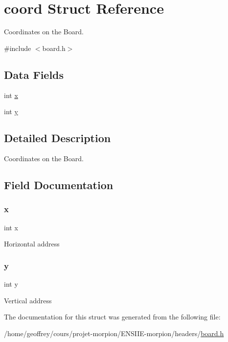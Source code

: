 \hypertarget{structcoord}{}\section{coord Struct Reference}
\label{structcoord}


Coordinates on the Board.  




{\ttfamily \#include $<$board.\+h$>$}

\subsection*{Data Fields}
\begin{DoxyCompactItemize}
\item 
int \hyperlink{structcoord_a6150e0515f7202e2fb518f7206ed97dc}{x}
\item 
int \hyperlink{structcoord_a0a2f84ed7838f07779ae24c5a9086d33}{y}
\end{DoxyCompactItemize}


\subsection{Detailed Description}
Coordinates on the Board. 

\subsection{Field Documentation}
\mbox{\label{structcoord_a6150e0515f7202e2fb518f7206ed97dc}} 
\subsubsection{\texorpdfstring{x}{x}}
{\footnotesize\ttfamily int x}

Horizontal address \mbox{\label{structcoord_a0a2f84ed7838f07779ae24c5a9086d33}} 
\subsubsection{\texorpdfstring{y}{y}}
{\footnotesize\ttfamily int y}

Vertical address 

The documentation for this struct was generated from the following file\+:\begin{DoxyCompactItemize}
\item 
/home/geoffrey/cours/projet-\/morpion/\+E\+N\+S\+I\+I\+E-\/morpion/headers/\hyperlink{board_8h}{board.\+h}\end{DoxyCompactItemize}
